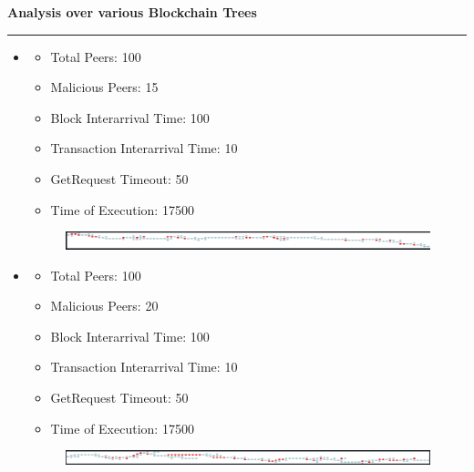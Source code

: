\documentclass[a4paper,12pt]{article}
\newenvironment{solution}[2][]{%
\begin{mdframed}[linecolor=blue!70!black, linewidth=2pt, roundcorner=10pt, backgroundcolor=yellow!10!white, skipabove=12pt, skipbelow=12pt]%
	\textbf{\large #2}
	\par\noindent\rule{\textwidth}{0.4pt}
}{
\end{mdframed}
}
\begin{document}
\begin{solution}{Analysis over various Blockchain Trees}
\begin{itemize}
				\item \begin{itemize}
					\vspace{-7pt}
					\item Total Peers: 100
					\vspace{-7pt}
					\item Malicious Peers: 15
					\vspace{-7pt}
					\item Block Interarrival Time: 100
					\vspace{-7pt}
					\item Transaction Interarrival Time: 10
					\vspace{-7pt}
					\item GetRequest Timeout: 50 
					\vspace{-7pt}
					\item Time of Execution: 17500
				\end{itemize}
				 \begin{figure}[H]
						\centering
						\includegraphics[width=\textwidth]{images/i_100_15_10_100_50_SE.png} 
					\end{figure}
	
	
		\item \begin{itemize}
			\vspace{-7pt}
			\item Total Peers: 100
			\vspace{-7pt}
			\item Malicious Peers: 20
			\vspace{-7pt}
			\item Block Interarrival Time: 100
			\vspace{-7pt}
			\item Transaction Interarrival Time: 10
			\vspace{-7pt}
			\item GetRequest Timeout: 50 
			\vspace{-7pt}
			\item Time of Execution: 17500
		\end{itemize}
		 \begin{figure}[H]
				\centering
				\includegraphics[width=\textwidth]{images/i_100_20_10_100_50_SE.png} 
			\end{figure}
	

\end{itemize}
\end{solution}
\end{document}
